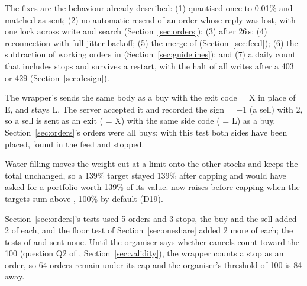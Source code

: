 

 The fixes are the behaviour already described: (1)  quantised once to 0.01\% and matched as sent; (2) no automatic resend of an order whose reply was lost, with one lock across write and search (Section~\ref{sec:orders}); (3)  after 26\,s; (4) reconnection with full-jitter backoff; (5) the merge of  (Section~\ref{sec:feed}); (6) the subtraction of working orders in  (Section~\ref{sec:guidelines}); and (7) a daily count that includes stops and survives a restart, with the halt of all writes after a 403 or 429 (Section~\ref{sec:design}).

 The wrapper's  sends the same  body as a buy with the exit code  = X in place of E, and  stays L. The server accepted it and recorded the sign  = −1 (a sell) with  2, so a sell is sent as an exit ( = X) with the same side code ( = L) as a buy. Section~\ref{sec:orders}'s orders were all buys; with this test both sides have been placed, found in the feed and stopped.

 Water-filling moves the weight cut at a limit onto the other stocks and keeps the total unchanged, so a 139\% target stayed 139\% after capping and  would have asked for a portfolio worth 139\% of its value.  now raises  before capping when the targets sum above , 100\% by default (D19).

 Section~\ref{sec:orders}'s tests used 5 orders and 3 stops, the buy and the sell added 2 of each, and the floor test of Section~\ref{sec:oneshare} added 2 more of each; the tests of  and  sent none. Until the organiser says whether cancels count toward the 100 (question Q2 of , Section~\ref{sec:validity}), the wrapper counts a stop as an order, so 64 orders remain under its cap and the organiser's threshold of 100 is 84 away.

